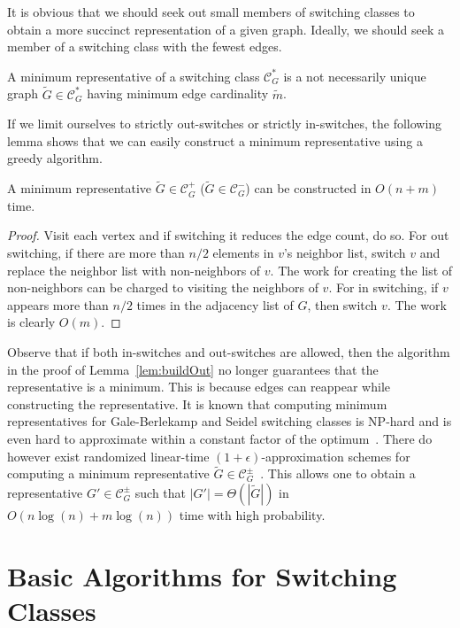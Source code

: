 \documentclass{llncs}
\begin{document}
It is obvious that we should seek out small members of switching classes to obtain a more succinct representation of a given graph.  Ideally, we should seek a member of a switching class with the fewest edges.
\begin{definition}
A minimum representative of a switching class $\mathcal{C}^*_G$ is a not necessarily unique graph $\widetilde{G} \in \mathcal{C}^*_G$ having minimum edge cardinality $\widetilde{m}$.
\end{definition}
If we limit ourselves to strictly out-switches or strictly in-switches, the following lemma shows that we can easily construct a minimum representative using a greedy algorithm.
\begin{lemma}\label{lem:buildOut}
\cite{DahlhausGM02} A minimum representative $\widetilde{G} \in \mathcal{C}^+_G$ ($\widetilde{G} \in\mathcal{C}^-_G$) can be constructed in $O(n+m)$ time.
\end{lemma}
\begin{proof}
Visit each vertex and if switching it reduces the edge count, do so. For out switching, if there are more than $n/2$ elements in $v$'s neighbor list, switch $v$ and replace the neighbor list with non-neighbors of $v$.  The work for creating the list of non-neighbors can be charged to visiting the neighbors of $v$. For in switching, if $v$ appears more than $n/2$ times in the adjacency list of $G$, then switch $v$.  The work is clearly $O(m)$.
\end{proof}

\noindent Observe that if both in-switches and out-switches are allowed, then the algorithm in the proof of Lemma~\ref{lem:buildOut} no longer guarantees that the representative is a minimum.  This is because edges can reappear while constructing the representative.  It is known that computing minimum representatives for Gale-Berlekamp and Seidel switching classes is NP-hard and is even hard to approximate within a constant factor of the optimum~\cite{RothV08,JelinkovaSHK11}.  There do however exist randomized linear-time $(1+\epsilon)$-approximation schemes for computing a minimum representative $\widetilde{G} \in \mathcal{C}^\pm_G$~\cite{KarpinskiS09}.  This allows one to obtain a representative $G' \in \mathcal{C}^\pm_G$ such that $|G'| = \Theta(|\widetilde{G}|)$ in $O(n\log(n)+m\log(n))$ time with high probability.



\section{Basic Algorithms for Switching Classes}
\end{document}
